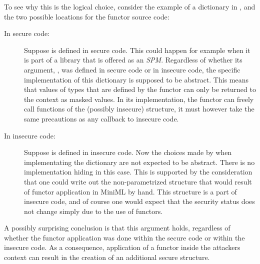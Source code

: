 \documentclass[10pt,a4paper,master=cws, masteroption=ai,english,inputenc=utf8]{kulemt}
\begin{document}
To see why this is the logical choice, consider the example of a dictionary in , and the two possible locations for the functor source code:
\begin{description}
\item[In secure code:] 
Suppose  is defined in secure code.
This could happen for example when it is part of a library that is offered as an \emph{SPM}.
Regardless of whether its argument, , was defined in secure code or in insecure code, the specific implementation of this dictionary is supposed to be abstract.
This means that values of types that are defined by the functor can only be returned to the context as masked values.
In its implementation, the functor can freely call functions of the (possibly insecure) structure, it must however take the same precautions as any callback to insecure code.
\item[In insecure code:] Suppose  is defined in insecure code.
Now the choices made by when implementating the dictionary are not expected to be abstract. There is no implementation hiding in this case.
This is supported by the consideration that one could write out the non-parametrized structure that would result of functor application in MiniML by hand. 
This structure is a part of insecure code, and of course one would expect that the security status does not change simply due to the use of functors.
\end{description}

A possibly surprising conclusion is that this argument holds, regardless of whether the functor application was done within the secure code or within the insecure code.
As a consequence, application of a functor inside the attackers context can result in the creation of an additional secure structure.
\end{document}
